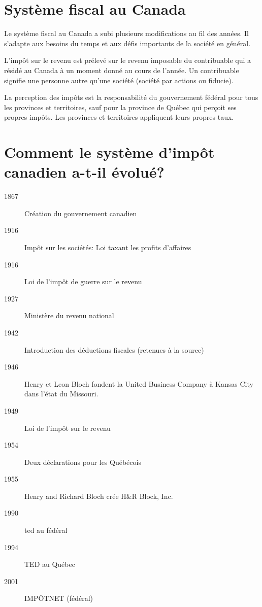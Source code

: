 \section{Système fiscal au Canada}
\begin{intro}
	Le système fiscal au Canada a subi plusieurs modifications au fil des années.  Il s'adapte aux besoins du temps et aux défis importants de la société en général.
\end{intro}
L'impôt sur le revenu est prélevé sur le \og revenu imposable\fg{} du contribuable qui a résidé au Canada à un moment donné au cours de l'année. Un \og contribuable\fg{} signifie une personne autre qu'une société (société par actions ou fiducie).

La perception des impôts est la responsabilité du gouvernement fédéral pour tous les provinces et territoires, sauf pour la province de Québec qui perçoit ses propres impôts. Les provinces et territoires appliquent leurs propres taux.



\section{Comment le système d'impôt canadien a-t-il évolué?}
\begin{description}
	\item[1867] Création du gouvernement canadien
	\item[1916] Impôt sur les sociétés: Loi taxant les profits d'affaires
	\item[1916] Loi de l'impôt de guerre sur le revenu
	\item[1927] Ministère du revenu national
	\item[1942] Introduction des déductions fiscales (retenues à la source)
	\item[\color{ForestGreen}1946] Henry et Leon Bloch fondent la United Business Company à Kansas City dans l'état du Missouri.
	\item[1949] Loi de l'impôt sur le revenu
	\item[1954] Deux déclarations pour les Québécois
	\item[\color{ForestGreen}1955] Henry and Richard Bloch crée H\&R Block, Inc.
	\item[1990] \acrfull{ted} au fédéral
	\item[1994] TED au Québec
	\item[2001] IMPÔTNET (fédéral)
\end{description}

